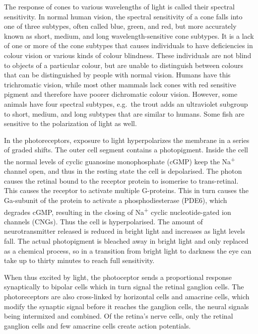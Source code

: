 \documentclass[]{book}
\begin{document}
The response of cones to various wavelengths of light is called their spectral sensitivity. In normal human vision, the spectral sensitivity of a cone falls into one of three subtypes, often called blue, green, and red, but more accurately known as short, medium, and long wavelength-sensitive cone subtypes. It is a lack of one or more of the cone subtypes that causes individuals to have deficiencies in colour vision or various kinds of colour blindness. These individuals are not blind to objects of a particular colour, but are unable to distinguish between colours that can be distinguished by people with normal vision. Humans have this trichromatic vision, while most other mammals lack cones with red sensitive pigment and therefore have poorer dichromatic colour vision. However, some animals have four spectral subtypes, e.g.~the trout adds an ultraviolet subgroup to short, medium, and long subtypes that are similar to humans. Some fish are sensitive to the polarization of light as well.

In the photoreceptors, exposure to light hyperpolarizes the membrane in a series of graded shifts. The outer cell segment contains a photopigment. Inside the cell the normal levels of cyclic guanosine monophosphate (cGMP) keep the Na\textsuperscript{+} channel open, and thus in the resting state the cell is depolarised. The photon causes the retinal bound to the receptor protein to isomerise to trans-retinal. This causes the receptor to activate multiple G-proteins. This in turn causes the Ga-subunit of the protein to activate a phosphodiesterase (PDE6), which degrades cGMP, resulting in the closing of Na\textsuperscript{+} cyclic nucleotide-gated ion channels (CNGs). Thus the cell is hyperpolarised. The amount of neurotransmitter released is reduced in bright light and increases as light levels fall. The actual photopigment is bleached away in bright light and only replaced as a chemical process, so in a transition from bright light to darkness the eye can take up to thirty minutes to reach full sensitivity.

When thus excited by light, the photoceptor sends a proportional response synaptically to bipolar cells which in turn signal the retinal ganglion cells. The photoreceptors are also cross-linked by horizontal cells and amacrine cells, which modify the synaptic signal before it reaches the ganglion cells, the neural signals being intermixed and combined. Of the retina's nerve cells, only the retinal ganglion cells and few amacrine cells create action potentials.
\end{document}
